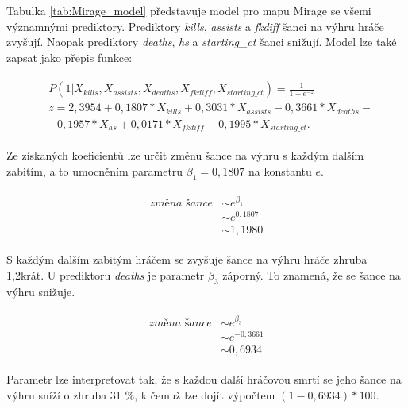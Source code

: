 Tabulka \ref{tab:Mirage_model} představuje model pro mapu Mirage se všemi významnými prediktory. Prediktory \textit{kills}, \textit{assists} a \textit{fkdiff} šanci na výhru
hráče zvyšují. Naopak prediktory \textit{deaths}, \textit{hs} a \textit{starting\_ct} šanci snižují. Model lze také zapsat jako přepis funkce:

\begin{align}
    \begin{split}
        &P(1 | X_{kills}, X_{assists}, X_{deaths}, X_{fkdiff}, X_{starting\_ct}) = \frac{1}{1 + e^{-z}} \\
        &z = 2,3954 + 0,1807*X_{kills} + 0,3031*X_{assists} - 0,3661*X_{deaths} - \\
        &- 0,1957*X_{hs} + 0,0171*X_{fkdiff} - 0,1995*X_{starting\_ct}.
    \end{split}
\end{align}

Ze získaných koeficientů lze určit změnu šance na výhru s každým dalším zabitím, a to umocněním parametru $\beta_1 = 0,1807$ na konstantu $e$.

\begin{align}
    \begin{split}
        \textit{změna šance} &\sim e^{\beta_1} \\
                             &\sim e^{0,1807} \\
                             &\sim 1,1980
    \end{split}
\end{align}

S každým dalším zabitým hráčem se zvyšuje šance na výhru hráče zhruba 1,2krát. U prediktoru \textit{deaths} je parametr $\beta_3$ záporný. To znamená, že se šance
na výhru snižuje.

\begin{align}
    \begin{split}
        \textit{změna šance} &\sim e^{\beta_3} \\
                             &\sim e^{-0,3661} \\                     
                             &\sim 0,6934
    \end{split}
\end{align}

Parametr lze interpretovat tak, že s každou další hráčovou smrtí se jeho šance na výhru sníží o zhruba 31 \%, k čemuž lze dojít výpočtem $(1 - 0,6934)*100$. 

